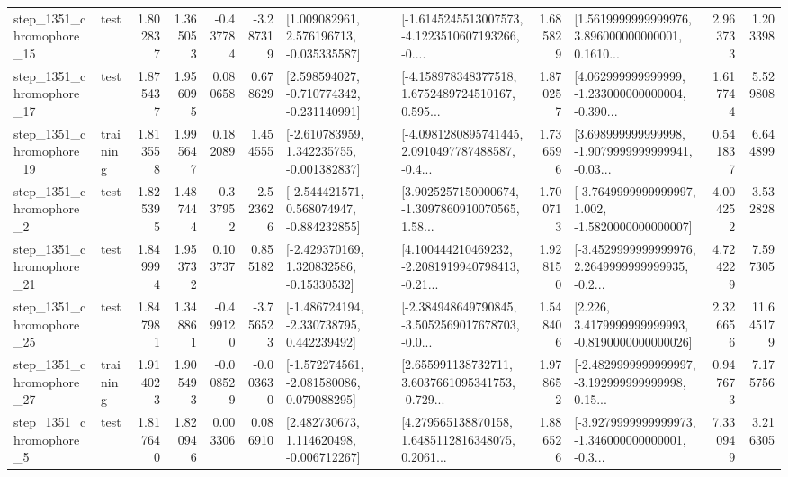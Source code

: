 \begin{tabular}{llrrrrllrlrr}
 step\_1351\_chromophore\_15 &      test &      1.802837 &    1.365053 &     -0.437784 & -3.287319 &    [1.009082961, 2.576196713, -0.035335587] &  [-1.6145245513007573, -4.1223510607193266, -0.... &       1.685829 &  [1.5619999999999976, 3.896000000000001, 0.1610... &            2.963733 &          1.203398 \\
 step\_1351\_chromophore\_17 &      test &      1.875437 &    1.956095 &      0.080658 &  0.678629 &   [2.598594027, -0.710774342, -0.231140991] &  [-4.158978348377518, 1.6752489724510167, 0.595... &       1.870257 &  [4.062999999999999, -1.233000000000004, -0.390... &            1.617744 &          5.529808 \\
 step\_1351\_chromophore\_19 &  training &      1.813558 &    1.995647 &      0.182089 &  1.454555 &   [-2.610783959, 1.342235755, -0.001382837] &  [-4.0981280895741445, 2.0910497787488587, -0.4... &       1.736596 &  [3.698999999999998, -1.9079999999999941, -0.03... &            0.541837 &          6.644899 \\
  step\_1351\_chromophore\_2 &      test &      1.825395 &    1.487444 &     -0.337952 & -2.523626 &   [-2.544421571, 0.568074947, -0.884232855] &  [3.9025257150000674, -1.3097860910070565, 1.58... &       1.700713 &  [-3.7649999999999997, 1.002, -1.5820000000000007] &            4.004252 &          3.532828 \\
 step\_1351\_chromophore\_21 &      test &      1.849994 &    1.953732 &      0.103737 &  0.855182 &    [-2.429370169, 1.320832586, -0.15330532] &  [4.100444210469232, -2.2081919940798413, -0.21... &       1.928150 &  [-3.4529999999999976, 2.2649999999999935, -0.2... &            4.724229 &          7.597305 \\
 step\_1351\_chromophore\_25 &      test &      1.847981 &    1.348861 &     -0.499120 & -3.756523 &   [-1.486724194, -2.330738795, 0.442239492] &  [-2.384948649790845, -3.5052569017678703, -0.0... &       1.548406 &   [2.226, 3.4179999999999993, -0.8190000000000026] &            2.326656 &         11.645179 \\
 step\_1351\_chromophore\_27 &  training &      1.914023 &    1.905493 &     -0.008529 & -0.003630 &   [-1.572274561, -2.081580086, 0.079088295] &  [2.655991138732711, 3.6037661095341753, -0.729... &       1.978652 &  [-2.4829999999999997, -3.192999999999998, 0.15... &            0.947673 &          7.175756 \\
  step\_1351\_chromophore\_5 &      test &      1.817640 &    1.820946 &      0.003306 &  0.086910 &    [2.482730673, 1.114620498, -0.006712267] &  [4.279565138870158, 1.6485112816348075, 0.2061... &       1.886526 &  [-3.9279999999999973, -1.346000000000001, -0.3... &            7.330949 &          3.216305 \\

\end{tabular}
